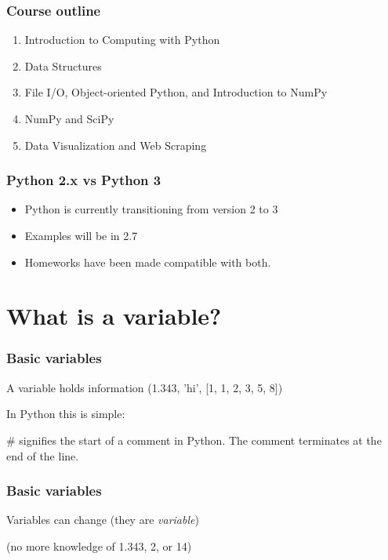 \documentclass{beamer}
\begin{document}
\begin{frame}
\frametitle{Course outline}

\begin{enumerate}
\setlength{\itemsep}{0.2in}

\item{Introduction to Computing with Python}
\item{Data Structures}
\item{File I/O, Object-oriented Python, and Introduction to NumPy}
\item{NumPy and SciPy}
\item{Data Visualization and Web Scraping}

\end{enumerate}

\end{frame}

\begin{frame}
\frametitle{Python 2.x vs Python 3}

\begin{itemize}
\setlength{\itemsep}{0.2in}
\item{Python is currently transitioning from version 2 to 3}
\item{Examples will be in 2.7}
\item{Homeworks have been made compatible with both.}
\end{itemize}

\end{frame}



\section{What is a variable?}
\begin{frame}
\frametitle{Basic variables}

A variable holds information (1.343, 'hi', [1, 1, 2, 3, 5, 8])

\vspace{0.2in}

In Python this is simple:


\textcolor{comment-color}{\#} signifies the start of a comment in Python.  The comment terminates at the end of the line.

\end{frame}


\begin{frame}
\frametitle{Basic variables}

Variables can change (they are \emph{variable})



(no more knowledge of 1.343, 2, or 14)

\end{frame}
\end{document}
